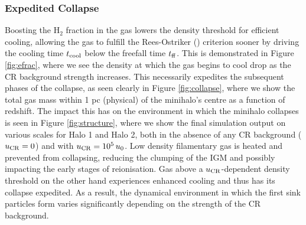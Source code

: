 \documentclass[usenatbib]{mn2e}
\newcommand{\htwo}{\mathrm{H}_2}
\newcommand{\ucr}{{u}_{\rm \small CR}}
\begin{document}
\subsubsection{Expedited Collapse}
\label{sec:expedited_collapse}
Boosting the $\htwo$ fraction in the gas lowers the density threshold for efficient cooling, allowing the gas to fulfill the Rees-Ostriker (\citeyear{ReesOstriker1977}) criterion sooner by driving the cooling time $t_{\rm \small cool}$ below the freefall time $t_{\rm \small ff}$.
This is demonstrated in Figure \ref{fig:efrac}, where we see the density at which the gas begins to cool drop as the CR background strength increases.  
This necessarily expedites the subsequent phases of the collapse, as seen clearly in Figure \ref{fig:collapse}, where we show the total gas mass within 1 pc (physical) of the minihalo's centre as a function of redshift.  
The impact this has on the environment in which the minihalo collapses is seen in Figure \ref{fig:structure}, where we show the final simulation output on various scales for Halo 1 and Halo 2, both in the absence of any CR background ($\ucr=0$) and with $\ucr=10^5\,u_0$. 
Low density filamentary gas is heated and prevented from collapsing, reducing the clumping of the IGM and possibly impacting the early stages of reionisation.
Gas above a $\ucr$-dependent density threshold on the other hand experiences enhanced cooling and thus has its collapse expedited.
As a result, the dynamical environment in which the first sink particles form varies significantly depending on the strength of the CR background.
\end{document}

